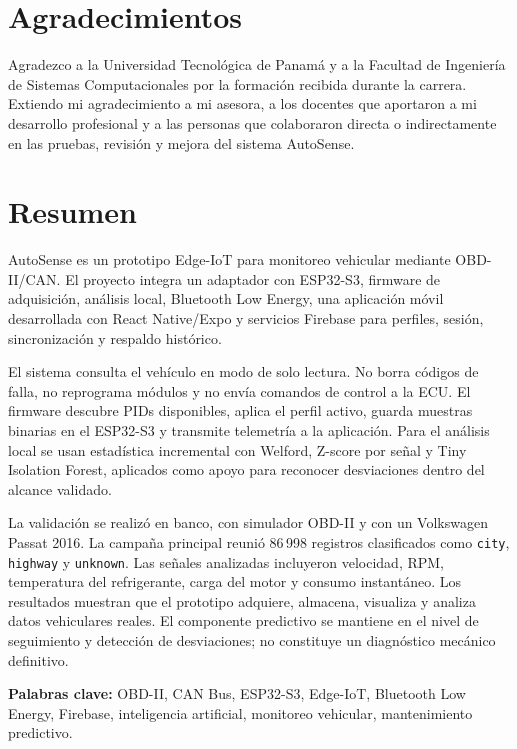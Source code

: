 \documentclass[12pt,letterpaper]{report}
\begin{document}
\newpage

\chapter*{Agradecimientos}

Agradezco a la Universidad Tecnológica de Panamá y a la Facultad de Ingeniería de Sistemas Computacionales por la formación recibida durante la carrera. Extiendo mi agradecimiento a mi asesora, a los docentes que aportaron a mi desarrollo profesional y a las personas que colaboraron directa o indirectamente en las pruebas, revisión y mejora del sistema AutoSense.

\newpage

\chapter*{Resumen}

AutoSense es un prototipo Edge-IoT para monitoreo vehicular mediante OBD-II/CAN. El proyecto integra un adaptador con ESP32-S3, firmware de adquisición, análisis local, Bluetooth Low Energy, una aplicación móvil desarrollada con React Native/Expo y servicios Firebase para perfiles, sesión, sincronización y respaldo histórico.

El sistema consulta el vehículo en modo de solo lectura. No borra códigos de falla, no reprograma módulos y no envía comandos de control a la ECU. El firmware descubre PIDs disponibles, aplica el perfil activo, guarda muestras binarias en el ESP32-S3 y transmite telemetría a la aplicación. Para el análisis local se usan estadística incremental con Welford, Z-score por señal y Tiny Isolation Forest, aplicados como apoyo para reconocer desviaciones dentro del alcance validado.

La validación se realizó en banco, con simulador OBD-II y con un Volkswagen Passat 2016. La campaña principal reunió 86\,998 registros clasificados como \texttt{city}, \texttt{highway} y \texttt{unknown}. Las señales analizadas incluyeron velocidad, RPM, temperatura del refrigerante, carga del motor y consumo instantáneo. Los resultados muestran que el prototipo adquiere, almacena, visualiza y analiza datos vehiculares reales. El componente predictivo se mantiene en el nivel de seguimiento y detección de desviaciones; no constituye un diagnóstico mecánico definitivo.

\textbf{Palabras clave:} OBD-II, CAN Bus, ESP32-S3, Edge-IoT, Bluetooth Low Energy, Firebase, inteligencia artificial, monitoreo vehicular, mantenimiento predictivo.
\end{document}

